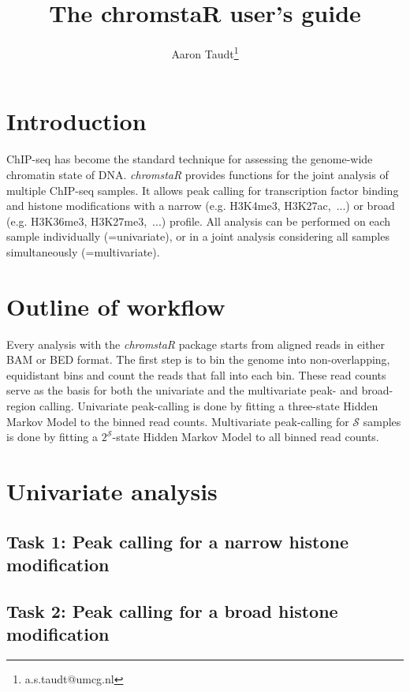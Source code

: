 \documentclass[11pt]{article}
\author{Aaron Taudt\footnote{a.s.taudt@umcg.nl}}
\newcommand{\Rpackage}[1]{{\textit{#1}}}
\begin{document}

\title{The chromstaR user's guide}

\maketitle

\tableofcontents
\section{Introduction}

ChIP-seq has become the standard technique for assessing the genome-wide chromatin state of DNA. \Rpackage{chromstaR} provides functions for the joint analysis of multiple ChIP-seq samples. It allows peak calling for transcription factor binding and histone modifications with a narrow (e.g. H3K4me3, H3K27ac,~...) or broad (e.g. H3K36me3, H3K27me3,~...) profile. All analysis can be performed on each sample individually (=univariate), or in a joint analysis considering all samples simultaneously (=multivariate).


\section{Outline of workflow}

Every analysis with the \Rpackage{chromstaR} package starts from aligned reads in either BAM or BED format. The first step is to bin the genome into non-overlapping, equidistant bins and count the reads that fall into each bin. These read counts serve as the basis for both the univariate and the multivariate peak- and broad-region calling. Univariate peak-calling is done by fitting a three-state Hidden Markov Model to the binned read counts. Multivariate peak-calling for $\mathcal{S}$ samples is done by fitting a $2^\mathcal{S}$-state Hidden Markov Model to all binned read counts.

\section{Univariate analysis}

\subsection{Task 1: Peak calling for a narrow histone modification}

\subsection{Task 2: Peak calling for a broad histone modification}
\end{document}
